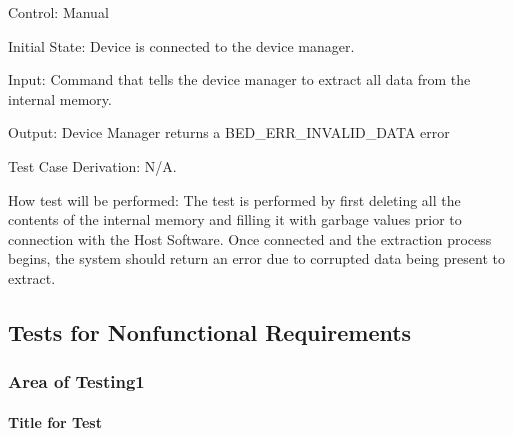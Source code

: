 \documentclass[12pt, titlepage]{article}
\begin{document}
\begin{enumerate}
		Control: Manual 
							
		Initial State: Device is connected to the device manager.
							
		Input: Command that tells the device manager to extract all data from the internal memory.
		
		Output: Device Manager returns a BED\_ERR\_INVALID\_DATA error
		
		Test Case Derivation: N/A.
							
		How test will be performed: The test is performed by first deleting all the contents of the internal memory and filling it with garbage values prior to connection with the Host Software. Once connected and 				the extraction process begins, the system should return an error due to corrupted data being present to extract.
\end{enumerate}
\subsection{Tests for Nonfunctional Requirements}




\subsubsection{Area of Testing1}
		
\paragraph{Title for Test}
\end{document}
